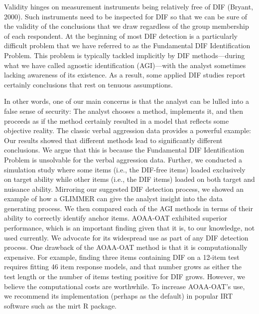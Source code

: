 \documentclass[
  english,
  man,floatsintext]{apa6}
\begin{document}
Validity hinges on measurement instruments being relatively free of DIF (Bryant, 2000). Such instruments need to be inspected for DIF so that we can be sure of the validity of the conclusions that we draw regardless of the group membership of each respondent. At the beginning of most DIF detection is a particularly difficult problem that we have referred to as the Fundamental DIF Identification Problem. This problem is typically tackled implicitly by DIF methods---during what we have called agnostic identification (AGI)---with the analyst sometimes lacking awareness of its existence. As a result, some applied DIF studies report certainly conclusions that rest on tenuous assumptions.

In other words, one of our main concerns is that the analyst can be lulled into a false sense of security: The analyst chooses a method, implements it, and then proceeds as if the method certainly resulted in a model that reflects some objective reality. The classic verbal aggression data provides a powerful example: Our results showed that different methods lead to significantly different conclusions. We argue that this is because the Fundamental DIF Identification Problem is unsolvable for the verbal aggression data. Further, we conducted a simulation study where some items (i.e., the DIF-free items) loaded exclusively on target ability while other items (i.e., the DIF items) loaded on both target and nuisance ability. Mirroring our suggested DIF detection process, we showed an example of how a GLIMMER can give the analyst insight into the data generating process. We then compared each of the AGI methods in terms of their ability to correctly identify anchor items. AOAA-OAT exhibited superior performance, which is an important finding given that it is, to our knowledge, not used currently. We advocate for its widespread use as part of any DIF detection process. One drawback of the AOAA-OAT method is that it is computationally expensive. For example, finding three items containing DIF on a 12-item test requires fitting 46 item response models, and that number grows as either the test length or the number of items testing positive for DIF grows. However, we believe the computational costs are worthwhile. To increase AOAA-OAT's use, we recommend its implementation (perhaps as the default) in popular IRT software such as the mirt R package.
\end{document}
